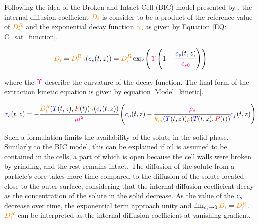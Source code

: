 \documentclass[../Article_Model_Parameters.tex]{subfiles}
\begin{document}
	Following the idea of the Broken-and-Intact Cell (BIC) model presented by \citet{Sovova2017}, the internal diffusion coefficient ${\color{orange}D_i}$ is consider to be a product of the reference value of ${\color{orange}D_i^R}$ and the exponential decay function ${\color{orange} \gamma}$, as given by Equation \ref{EQ: C_sat_function}.
		
	{\footnotesize
		\begin{equation}
			{\color{orange}D_i} = {\color{orange}D_i^R} {\color{orange} \gamma}({\color{blue} c_s} (t,z)) = {\color{orange}D_i^R} \exp\left( {\color{magenta}\Upsilon} \left( 1-\cfrac{{\color{blue} c_s} (t,z) }{{\color{magenta}c_{s0}}} \right) \right) \label{EQ: C_sat_function}
		\end{equation} }
	
	where the ${\color{magenta}\Upsilon}$ describe the curvature of the decay function. The final form of the extraction kinetic equation is given by equation \ref{Model_kinetic}.
			
	{\scriptsize
		\begin{equation}
			\label{Model_kinetic}
				{\color{blue}r_e}(t,z) = -\cfrac{{\color{orange}D_i^R}({\color{blue}T}(t,z), {\color{red}P}(t)) {\color{orange} \gamma}({\color{blue} c_s} (t,z)) }{{\color{magenta} \mu l^2} } \left({\color{blue}{\color{blue} c_s} }(t,z)  - \cfrac{{\color{magenta}\rho_s}}{{\color{orange}k_m}({\color{blue}T}(t,z)){\color{orange}\rho}({\color{blue}T}(t,z),{\color{red}P}(t))}  {\color{blue}c_f}(t,z) \right)
		\end{equation} }
	
	Such a formulation limits the availability of the solute in the solid phase. Similarly to the BIC model, this can be explained if oil is assumed to be contained in the cells, a part of which is open because the cell walls were broken by grinding, and the rest remains intact. The diffusion of the solute from a particle's core takes more time compared to the diffusion of the solute located close to the outer surface, considering that the internal diffusion coefficient decay as the concentration of the solute in the solid decrease. As the value of the ${\color{blue}c_s}$ decrease over time, the exponential term approach unity and $\lim_{ {\color{blue}c_s} \rightarrow 0} {\color{orange}D_i} =  {\color{orange}D_i^R}$. ${\color{orange}D_i^R}$ can be interpreted as the internal diffusion coefficient at vanishing gradient. 
		
\end{document}
